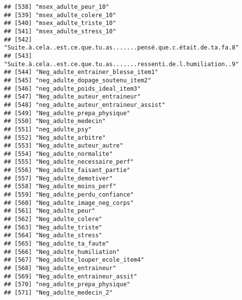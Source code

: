 \documentclass[
]{article}
\begin{document}
\begin{verbatim}
## [538] "msex_adulte_peur_10"                                               
## [539] "msex_adulte_colere_10"                                             
## [540] "msex_adulte_triste_10"                                             
## [541] "msex_adulte_stress_10"                                             
## [542] "Suite.à.cela..est.ce.que.tu.as.......pensé.que.c.était.de.ta.fa.8" 
## [543] "Suite.à.cela..est.ce.que.tu.as.......ressenti.de.l.humiliation..9" 
## [544] "Neg_adulte_entrainer_blesse_item1"                                 
## [545] "neg_adulte_dopage_soutenu_item2"                                   
## [546] "neg_adulte_poids_ideal_item3"                                      
## [547] "Neg_adulte_auteur_entraineur"                                      
## [548] "neg_adulte_auteur_entraineur_assist"                               
## [549] "Neg_adulte_prepa_physique"                                         
## [550] "Neg_adulte_medecin"                                                
## [551] "neg_adulte_psy"                                                    
## [552] "Neg_adulte_arbitre"                                                
## [553] "Neg_adulte_auteur_autre"                                           
## [554] "Neg_adulte_normalite"                                              
## [555] "Neg_adulte_necessaire_perf"                                        
## [556] "Neg_adulte_faisant_partie"                                         
## [557] "Neg_adulte_demotiver"                                              
## [558] "Neg_adulte_moins_perf"                                             
## [559] "Neg_adulte_perdu_confiance"                                        
## [560] "Neg_adulte_image_neg_corps"                                        
## [561] "Neg_adulte_peur"                                                   
## [562] "Neg_adulte_colere"                                                 
## [563] "Neg_adulte_triste"                                                 
## [564] "Neg_adulte_stress"                                                 
## [565] "Neg_adulte_ta_faute"                                               
## [566] "Neg_adulte_humiliation"                                            
## [567] "Neg_adulte_louper_ecole_item4"                                     
## [568] "Neg_adulte_entraineur"                                             
## [569] "Neg_adulte_entraineur_assit"                                       
## [570] "neg_adulte_prepa_physique"                                         
## [571] "Neg_adulte_medecin_2"                                              

\end{verbatim}
\end{document}
